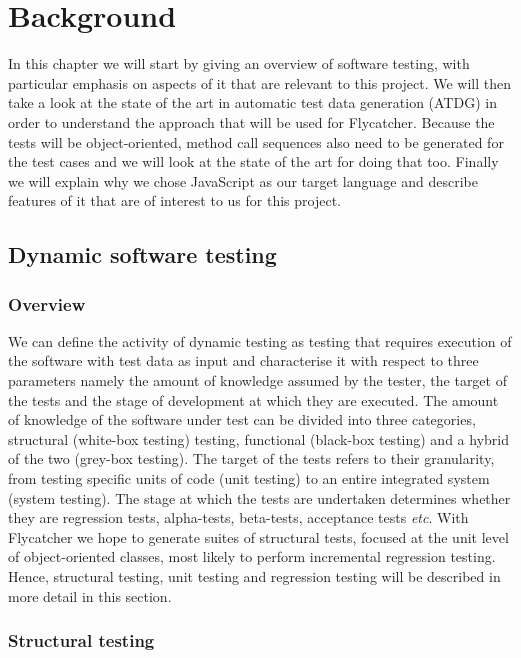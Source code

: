 \documentclass[a4paper,11pt,titlepage]{report}
\begin{document}
\chapter{Background}
In this chapter we will start by giving an overview of software testing, with particular emphasis on aspects of it that are relevant to this project. We will then take a look at the state of the art in automatic test data generation (ATDG) in order to understand the approach that will be used for Flycatcher. Because the tests will be object-oriented, method call sequences also need to be generated for the test cases and we will look at the state of the art for doing that too. Finally we will explain why we chose JavaScript as our target language and describe features of it that are of interest to us for this project.

\section{Dynamic software testing}

\subsection{Overview}

We can define the activity of dynamic testing as testing that requires execution of the software with test data as input \cite{mahmood2007systematic} and characterise it with respect to three parameters namely the amount of knowledge assumed by the tester, the target of the tests and the stage of development at which they are executed. The amount of knowledge of the software under test can be divided into three categories, structural (white-box testing) testing, functional (black-box testing) and a hybrid of the two (grey-box testing). The target of the tests refers to their granularity, from testing specific units of code (unit testing) to an entire integrated system (system testing). The stage at which the tests are undertaken determines whether they are regression tests, alpha-tests, beta-tests, acceptance tests \emph{etc}. With Flycatcher we hope to generate suites of structural tests, focused at the unit level of object-oriented classes, most likely to perform incremental regression testing. Hence, structural testing, unit testing and regression testing will be described in more detail in this section.

\subsection{Structural testing}
\end{document}
